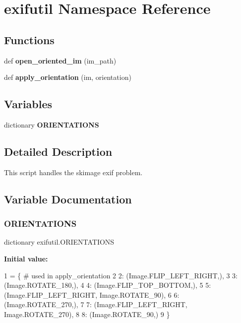 \hypertarget{namespaceexifutil}{}\section{exifutil Namespace Reference}
\label{namespaceexifutil}
\subsection*{Functions}
\begin{DoxyCompactItemize}
\item 
\mbox{\label{namespaceexifutil_ae6019994ff716ec7bba97215b2131705}} 
def {\bfseries open\+\_\+oriented\+\_\+im} (im\+\_\+path)
\item 
\mbox{\label{namespaceexifutil_a580f148516d4ae537df39ae625297a88}} 
def {\bfseries apply\+\_\+orientation} (im, orientation)
\end{DoxyCompactItemize}
\subsection*{Variables}
\begin{DoxyCompactItemize}
\item 
dictionary {\bfseries O\+R\+I\+E\+N\+T\+A\+T\+I\+O\+NS}
\end{DoxyCompactItemize}


\subsection{Detailed Description}
\begin{DoxyVerb}This script handles the skimage exif problem.
\end{DoxyVerb}
 

\subsection{Variable Documentation}
\mbox{\label{namespaceexifutil_a3a9af3bec6523588f629cca64bda0913}} 
\subsubsection{\texorpdfstring{O\+R\+I\+E\+N\+T\+A\+T\+I\+O\+NS}{ORIENTATIONS}}
{\footnotesize\ttfamily dictionary exifutil.\+O\+R\+I\+E\+N\+T\+A\+T\+I\+O\+NS}

{\bfseries Initial value\+:}
\begin{DoxyCode}
1 =  \{   \textcolor{comment}{\# used in apply\_orientation}
2     2: (Image.FLIP\_LEFT\_RIGHT,),
3     3: (Image.ROTATE\_180,),
4     4: (Image.FLIP\_TOP\_BOTTOM,),
5     5: (Image.FLIP\_LEFT\_RIGHT, Image.ROTATE\_90),
6     6: (Image.ROTATE\_270,),
7     7: (Image.FLIP\_LEFT\_RIGHT, Image.ROTATE\_270),
8     8: (Image.ROTATE\_90,)
9 \}
\end{DoxyCode}
